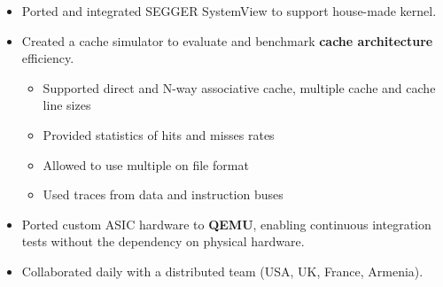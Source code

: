 \documentclass[10pt,a4paper]{altacv}
\begin{document}
\begin{paracol}{2}
\begin{itemize}
\begin{itemize}
\end{itemize}
\item Ported and integrated SEGGER SystemView to support house-made kernel.
\item Created a cache simulator to evaluate and benchmark \textbf{\textcolor{bold}{cache architecture}} efficiency.
\begin{itemize}
    \item Supported direct and N-way associative cache, multiple cache and cache line sizes 
    \item Provided statistics of hits and misses rates
    \item Allowed to use multiple on file format
    \item Used traces from data and instruction buses
\end{itemize}
\item Ported custom ASIC hardware to \textbf{\textcolor{bold}{QEMU}}, enabling continuous integration tests without the dependency on physical hardware.
\item Collaborated daily with a distributed team (USA, UK, France, Armenia).
\end{itemize}

\divider


\end{paracol}
\end{document}
